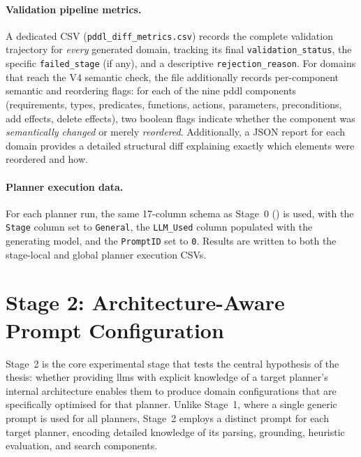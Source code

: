 \paragraph{Validation pipeline metrics.}
A dedicated CSV (\texttt{pddl\_diff\_metrics.csv}) records the complete validation trajectory for \emph{every} generated domain, tracking its final \texttt{validation\_status}, the specific \texttt{failed\_stage} (if any), and a descriptive \texttt{rejection\_reason}.
For domains that reach the V4 semantic check, the file additionally records per-component semantic and reordering flags: for each of the nine \gls{pddl} components (requirements, types, predicates, functions, actions, parameters, preconditions, add effects, delete effects), two boolean flags indicate whether the component was \emph{semantically changed} or merely \emph{reordered}.
Additionally, a JSON report for each domain provides a detailed structural diff explaining exactly which elements were reordered and how.

\paragraph{Planner execution data.}
For each planner run, the same 17-column schema as Stage~0 () is used, with the \texttt{Stage} column set to \texttt{General}, the \texttt{LLM\_Used} column populated with the generating model, and the \texttt{PromptID} set to \texttt{0}.
Results are written to both the stage-local and global planner execution CSVs.


\section{Stage 2: Architecture-Aware Prompt Configuration}
\label{sec:design:stage2}

Stage~2 is the core experimental stage that tests the central hypothesis of the thesis: whether providing \glspl{llm} with explicit knowledge of a target planner's internal architecture enables them to produce domain configurations that are specifically optimised for that planner.
Unlike Stage~1, where a single generic prompt is used for all planners, Stage~2 employs a distinct prompt for each target planner, encoding detailed knowledge of its parsing, grounding, heuristic evaluation, and search components.

